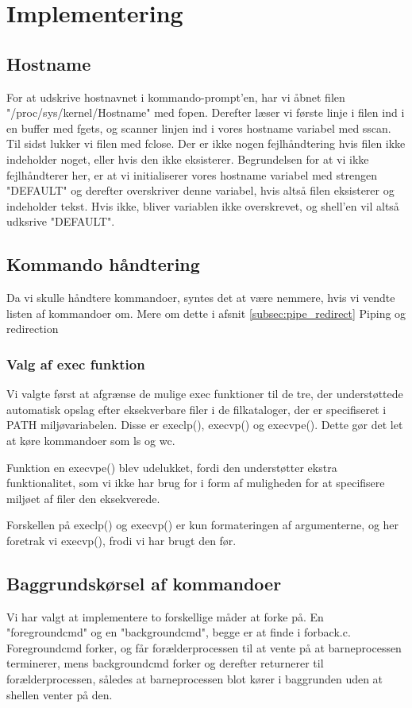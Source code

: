 \section{Implementering}

\subsection{Hostname}
For at udskrive hostnavnet i kommando-prompt'en, har vi åbnet filen "/proc/sys/kernel/Hostname" med fopen. Derefter læser vi første linje i filen ind i en buffer med fgets, og scanner linjen ind i vores hostname variabel med sscan. Til sidst lukker vi filen med fclose. Der er ikke nogen fejlhåndtering hvis filen ikke indeholder noget, eller hvis den ikke eksisterer. Begrundelsen for at vi ikke fejlhåndterer her, er at vi initialiserer vores hostname variabel med strengen "DEFAULT" og derefter overskriver denne variabel, hvis altså filen eksisterer og indeholder tekst. Hvis ikke, bliver variablen ikke overskrevet, og shell'en vil altså udksrive "DEFAULT".

\subsection{Kommando håndtering}
Da vi skulle håndtere kommandoer, syntes det at være nemmere, hvis vi vendte listen af kommandoer om. Mere om dette i afsnit \ref{subsec:pipe_redirect} Piping og redirection

\subsubsection{Valg af exec funktion}
Vi valgte først at afgrænse de mulige exec funktioner til de tre, der understøttede automatisk opslag efter eksekverbare filer i de filkataloger, der er specifiseret i PATH miljøvariabelen. Disse er execlp(), execvp() og execvpe(). Dette gør det let at køre kommandoer som ls og wc.

Funktion en execvpe() blev udelukket, fordi den understøtter ekstra funktionalitet, som vi ikke har brug for i form af muligheden for at specifisere miljøet af filer den eksekverede.

Forskellen på execlp() og execvp() er kun formateringen af argumenterne, og her foretrak vi execvp(), frodi vi har brugt den før.

\subsection{Baggrundskørsel af kommandoer}
Vi har valgt at implementere to forskellige måder at forke på. En "foregroundcmd" og en "backgroundcmd", begge er at finde i forback.c. Foregroundcmd forker, og får forælderprocessen til at vente på at barneprocessen terminerer, mens backgroundcmd forker og derefter returnerer til forælderprocessen, således at barneprocessen blot kører i baggrunden uden at shellen venter på den.


